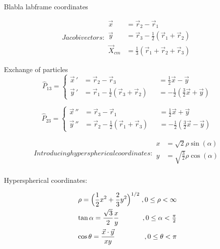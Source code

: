 \documentclass{article}
\begin{document}
Blabla labframe coordinates

\begin{subequations} \label{eq:1}
Jacobi vectors:
\begin{align}
        \vec{x} 		&= \vec{r}_2 - \vec{r}_1\\
        \vec{y} 		&= \vec{r}_3 - \frac{1}{2}(\vec{r}_1 + \vec{r}_2)\\
        \vec{X}_{cm} 	&= \frac{1}{3} (\vec{r}_1 + \vec{r}_2 + \vec{r}_3)
\end{align}
\end{subequations}

Exchange of particles
\begin{equation}
\hat{P}_{13} = \left \{ \begin{aligned}
        \vec{x} \, ' &= \vec{r}_2 - \vec{r}_3 &&= \frac{1}{2}\vec{x} - \vec{y} \\
        \vec{y} \, ' &= \vec{r}_1 - \frac{1}{2}(\vec{r}_3 + \vec{r}_2) &&= -\frac{1}{2} (\frac{3}{2} \vec{x} + \vec{y})
       \end{aligned}
 \right.
 \end{equation}
 
\begin{equation}
\hat{P}_{23} = \left \{ \begin{aligned}
        \vec{x} \, '' &= \vec{r}_3 - \vec{r}_1 &&= \frac{1}{2}\vec{x} + \vec{y} \\
        \vec{y} \, '' &= \vec{r}_2 - \frac{1}{2}(\vec{r}_1 + \vec{r}_3) &&= -\frac{1}{2} (\frac{3}{2} \vec{x} - \vec{y})
       \end{aligned}
 \right.
 \end{equation}

\begin{subequations}
Introducing hyperspherical coordinates:
\begin{align}
        x &= \sqrt{2} \rho \sin(\alpha)\\
        y &= \sqrt{\frac{3}{2}} \rho \cos(\alpha)\\
\end{align}
\end{subequations}

Hyperspherical coordinates:
\[\arraycolsep=1.4pt\def\arraystretch{2.2}
     \left. \begin{array}{lr}
        \rho = \displaystyle \Big( \frac{1}{2}x^2 + \frac{2}{3}y^2 \Big) ^{1/2} &,  0\leq \rho < \infty\\
        \tan{\alpha} = \displaystyle \frac{\sqrt{3}}{2} \frac{x}{y} &,  0\leq \alpha < \frac{\pi}{2}\\
        \cos{\theta} = \displaystyle \frac{\vec{x} \cdot \vec{y}}{xy} &,  0\leq \theta < \pi
        \end{array}\right.
  \]
\end{document}
